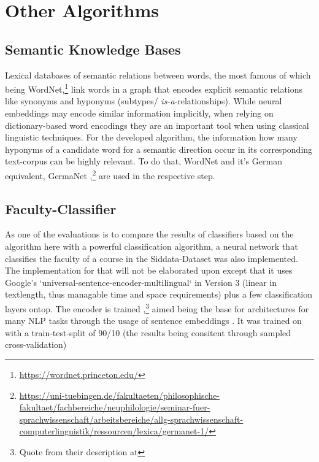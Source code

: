 \section{Other Algorithms}

\subsection{Semantic Knowledge Bases}

Lexical databases of semantic relations between words, the most famous of which being WordNet,\footnote{\url{https://wordnet.princeton.edu/}} link words in a graph that encodes explicit semantic relations like synonyms and hyponyms (subtypes/ \emph{is-a}-relationships). While neural %
embeddings may encode similar information implicitly, when relying on dictionary-based word encodings they are an important tool when using classical linguistic techniques. For the developed algorithm, the information how many hyponyms of a candidate word for a semantic direction %
occur in its corresponding text-corpus can be highly relevant. To do that, WordNet \cite{Miller1995} and it's German equivalent, GermaNet \cite{hamp-feldweg-1997-germanet,Henrich},\footnote{\url{https://uni-tuebingen.de/fakultaeten/philosophische-fakultaet/fachbereiche/neuphilologie/seminar-fuer-sprachwissenschaft/arbeitsbereiche/allg-sprachwissenschaft-computerlinguistik/ressourcen/lexica/germanet-1/}} are used in the respective step.


\subsection{Faculty-Classifier}
\label{sec:faculty_classifier}

As one of the evaluations is to compare the results of classifiers based on the algorithm here with a powerful classification algorithm, a neural network that classifies the faculty of a course in the Siddata-Dataset was also implemented. The implementation for that will not be elaborated upon except %
that it uses Google's `universal-sentence-encoder-multilingual` in Version 3 (linear in textlength, thus managable time and space requirements) plus a few classification layers ontop. The encoder is trained ,\footnote{Quote from their description at   } aimed being the base for architectures for many NLP tasks through the usage of sentence embeddings \cite{Guo}. It was trained on with a train-test-split of 90/10 (the results being consitent through sampled cross-validation)


